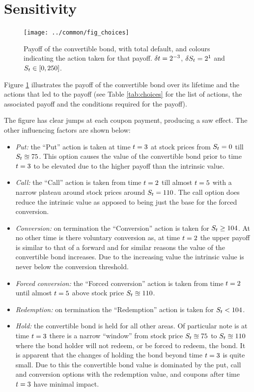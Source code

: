 \documentclass[a4paper,11pt,oneside]{report}
\theoremstyle{plain}
\theoremstyle{definition}
\begin{document}

\section{Sensitivity}

\begin{figure}[htb!]
 \centering
 \texttt{[image: ../common/fig\_choices]}
 \caption[Payoff]{Payoff of the convertible bond, with total default, and colours indicating the action taken for that payoff.  $\Dt = 2^{-3}$, $\DS = 2^{1}$ and $\S \in [0, 250]$.}
 \label{fig:choices}
\end{figure}

Figure \ref{fig:choices} illustrates the payoff of the convertible bond over its lifetime and the actions that led to the payoff (see Table \ref{tab:choices} for the list of actions, the associated payoff and the conditions required for the payoff).

The figure has clear jumps at each coupon payment, producing a saw effect.  The other influencing factors are shown below:
\begin{itemize}
 \item \emph{Put:} the ``Put'' action is taken at time $\t = 3$ at stock prices from $\S = 0$ till $\S \approxeq 75$.  This option causes the value of the convertible bond prior to time $\t = 3$ to be elevated due to the higher payoff than the intrinsic value.
 \item \emph{Call:} the ``Call'' action is taken from time $\t = 2$ till almost $\t = 5$ with a narrow plateau around stock prices around $\S = 110$.  The call option does reduce the intrinsic value as apposed to being just the base for the forced conversion.
 \item \emph{Conversion:} on termination the ``Conversion'' action is taken for $\S \ge 104$.  At no other time is there voluntary conversion as, at time $\t = 2$ the upper payoff is similar to that of a forward and for similar reasons the value of the convertible bond increases.  Due to the increasing value the intrinsic value is never below the conversion threshold.
 \item \emph{Forced conversion:} the ``Forced conversion'' action is taken from time $\t = 2$ until almost $\t = 5$ above stock price $\S \approxeq 110$.
 \item \emph{Redemption:} on termination the ``Redemption'' action is taken for $\S < 104$.
 \item \emph{Hold:} the convertible bond is held for all other areas.  Of particular note is at time $\t = 3$ there is a narrow ``window'' from stock price $\S \approxeq 75$ to $\S \approxeq 110$ where the bond holder will not redeem, or be forced to redeem, the bond.  It is apparent that the changes of holding the bond beyond time $\t = 3$ is quite small.  Due to this the convertible bond value is dominated by the put, call and conversion options with the redemption value, and coupons after time $\t = 3$ have minimal impact.
\end{itemize}
\end{document}
